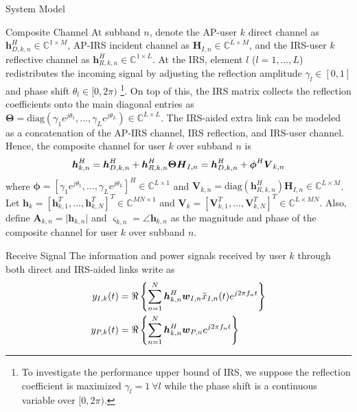 \documentclass{IEEEtran}
\begin{document}
\begin{section}{System Model}
	\begin{subsection}{Composite Channel}
		At subband $n$, denote the AP-user $k$ direct channel as $\boldsymbol{h}_{D,k,n}^H \in \mathbb{C}^{1 \times M}$, AP-IRS incident channel as $\boldsymbol{H}_{I,n} \in \mathbb{C}^{L \times M}$, and the IRS-user $k$ reflective channel as $\boldsymbol{h}_{R,k,n}^H \in \mathbb{C}^{1 \times L}$. At the IRS, element $l$ ($l=1,\dots,L$) redistributes the incoming signal by adjusting the reflection amplitude $\gamma_l \in [0,1]$ and phase shift $\theta_l \in [0,2\pi)$ \footnote{To investigate the performance upper bound of IRS, we suppose the reflection coefficient is maximized $\gamma_l=1 \ \forall l$ while the phase shift is a continuous variable over $[0,2\pi)$.}. On top of this, the IRS matrix collects the reflection coefficients onto the main diagonal entries as $\boldsymbol{\Theta} = \mathrm{diag}(\gamma_1 e^{j \theta_1}, \dots, \gamma_L e^{j \theta_L}) \in \mathbb{C}^{L \times L}$. The IRS-aided extra link can be modeled as a concatenation of the AP-IRS channel, IRS reflection, and IRS-user channel. Hence, the composite channel for user $k$ over subband $n$ is
		\begin{equation}\label{eq:h_{k,n}}
			\boldsymbol{h}_{k,n}^H = \boldsymbol{h}_{D,k,n}^H + \boldsymbol{h}_{R,k,n}^H \boldsymbol{\Theta} \boldsymbol{H}_{I,n} = \boldsymbol{h}_{D,k,n}^H + \boldsymbol{\phi}^H \boldsymbol{V}_{k,n}
		\end{equation}
		where $\boldsymbol{\phi}=[\gamma_1 e^{j \theta_1}, \dots, \gamma_L e^{j \theta_L}]^H \in \mathbb{C}^{L \times 1}$ and $\boldsymbol{V}_{k,n}=\mathrm{diag}(\boldsymbol{h}_{R,k,n}^H)\boldsymbol{H}_{I,n} \in \mathbb{C}^{L \times M}$. Let $\boldsymbol{h}_k=[\boldsymbol{h}_{k,1}^T,\dots,\boldsymbol{h}_{k,N}^T]^T \in \mathbb{C}^{MN \times 1}$ and $\boldsymbol{V}_k=[\boldsymbol{V}_{k,1}^T,\dots,\boldsymbol{V}_{k,N}^T]^T \in \mathbb{C}^{L \times MN}$. Also, define $\boldsymbol{A}_{k,n}=\lvert \boldsymbol{h}_{k,n} \rvert$ and $\boldsymbol{\varsigma}_{k,n}=\angle{\boldsymbol{h}_{k,n}}$ as the magnitude and phase of the composite channel for user $k$ over subband $n$.
	\end{subsection}

	\begin{subsection}{Receive Signal}
		The information and power signals received by user $k$ through both direct and IRS-aided links write as
		\begin{align}\label{eq:y_{I/P,k}}
			y_{I,k}(t) & = \Re\left\{\sum_{n=1}^N{\boldsymbol{h}_{k,n}^H}{\boldsymbol{w}_{I,n}\tilde{x}_{I,n}(t)}{e^{j2{\pi}{f_n}{t}}}\right\}\\
			y_{P,k}(t) & = \Re\left\{\sum_{n=1}^N{\boldsymbol{h}_{k,n}^H}\boldsymbol{w}_{P,n}{e^{j2{\pi}{f_n}{t}}}\right\}
		\end{align}
	\end{subsection}


\end{section}
\end{document}
